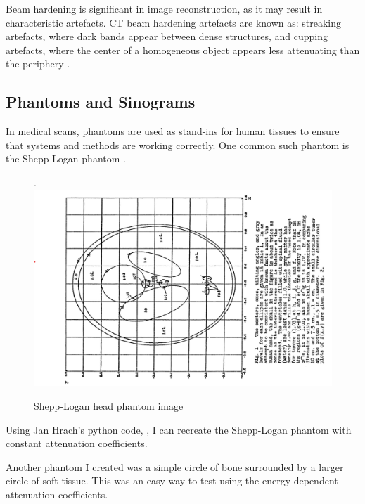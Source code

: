 \documentclass{article}
\begin{document}
Beam hardening is significant in image reconstruction, as it may result in characteristic artefacts. CT beam hardening artefacts are known as: streaking artefacts, where dark bands appear between dense structures, and cupping artefacts, where the center of a homogeneous object appears less attenuating than the periphery \cite{Murphy_2016}.

\subsection{Phantoms and Sinograms}
In medical scans, phantoms are used as stand-ins for human tissues to ensure that systems and methods are working correctly. One common such phantom is the Shepp-Logan phantom \cite{Shepp_Logan_1974}. 

\begin{figure}.
	\includegraphics[width=\linewidth]{shepplogan.png}
	\caption{Shepp-Logan head phantom image}
	\label{fig:shepplogan}
\end{figure}

Using Jan Hrach's python code, \cite{phantom_py}, I can recreate the Shepp-Logan phantom with constant attenuation coefficients.

Another phantom I created was a simple circle of bone surrounded by a larger circle of soft tissue. This was an easy way to test using the energy dependent attenuation coefficients.
\end{document}
